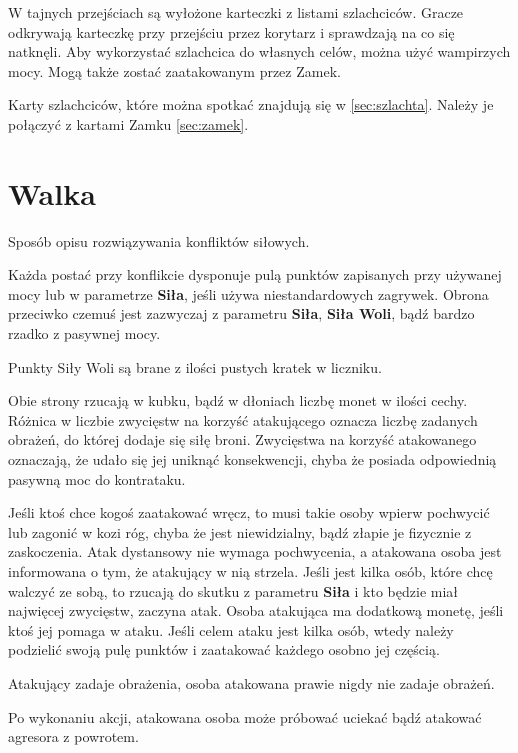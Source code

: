 		W tajnych przejściach są wyłożone karteczki z listami szlachciców.
		Gracze odkrywają karteczkę przy przejściu przez korytarz i sprawdzają na co się natknęli.
		Aby wykorzystać szlachcica do własnych celów, można użyć wampirzych mocy.
		Mogą także zostać zaatakowanym przez Zamek.
		
		Karty szlachciców, które można spotkać znajdują się w \ref{sec:szlachta}.
		Należy je połączyć z kartami Zamku \ref{sec:zamek}.
		
\section{Walka}
	Sposób opisu rozwiązywania konfliktów siłowych.
	
	Każda postać przy konflikcie dysponuje pulą punktów zapisanych przy używanej mocy lub w parametrze \textbf{Siła}, jeśli używa niestandardowych zagrywek.
	Obrona przeciwko czemuś jest zazwyczaj z parametru \textbf{Siła}, \textbf{Siła Woli}, bądź bardzo rzadko z pasywnej mocy.
	
	Punkty Siły Woli są brane z ilości pustych kratek w liczniku.
	
	Obie strony rzucają w kubku, bądź w dłoniach liczbę monet w ilości cechy.
	Różnica w liczbie zwycięstw na korzyść atakującego oznacza liczbę zadanych obrażeń, do której dodaje się siłę broni.
	Zwycięstwa na korzyść atakowanego oznaczają, że udało się jej uniknąć konsekwencji, chyba że posiada odpowiednią pasywną moc do kontrataku.
	
	Jeśli ktoś chce kogoś zaatakować wręcz, to musi takie osoby wpierw pochwycić lub zagonić w kozi róg, chyba że jest niewidzialny, bądź złapie je fizycznie z zaskoczenia.
	Atak dystansowy nie wymaga pochwycenia, a atakowana osoba jest informowana o tym, że atakujący w nią strzela.
	Jeśli jest kilka osób, które chcę walczyć ze sobą, to rzucają do skutku z parametru \textbf{Siła} i kto będzie miał najwięcej zwycięstw, zaczyna atak.
	Osoba atakująca ma dodatkową monetę, jeśli ktoś jej pomaga w ataku.
	Jeśli celem ataku jest kilka osób, wtedy należy podzielić swoją pulę punktów i zaatakować każdego osobno jej częścią.
	
	Atakujący zadaje obrażenia, osoba atakowana prawie nigdy nie zadaje obrażeń.
	
	Po wykonaniu akcji, atakowana osoba może próbować uciekać bądź atakować agresora z powrotem.

